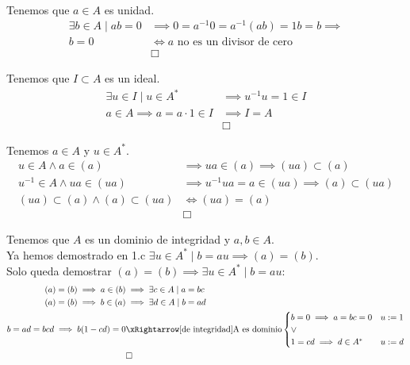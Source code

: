 \begin{solution}\\
Tenemos que $a \in A$ es unidad.
\begin{align}
\exists b \in A \mid ab = 0 
&\implies 0 = a^{-1}0 = a^{-1}(ab) = 1b = b \implies\\
b = 0 &\iff a \text{ no es un divisor de cero}\\
&\Box
\end{align}

Tenemos que $I \subset A$ es un ideal.
\begin{align}
\exists u \in I \mid u \in A^* &\implies u^{-1}u = 1 \in I\\
a \in A \implies a = a \cdot 1 \in I &\implies I=A\\
&\Box
\end{align}

Tenemos $a \in A$ y $u \in A^*$.
\begin{align}
u \in A \land a \in (a)
&\implies ua \in (a) 
\implies (ua) \subset (a)\\
u^{-1} \in A \land ua \in (ua)
&\implies u^{-1}ua = a \in (ua) 
\implies (a) \subset (ua)\\
(ua) \subset (a) \land (a) \subset (ua) &\iff (ua) = (a)\\
&\Box
\end{align}

Tenemos que $A$ es un dominio de integridad y $a,b \in A$. \\
Ya hemos demostrado en 1.c $\exists u \in A^* \mid b = au \implies (a) = (b)$.\\
Solo queda demostrar $(a) = (b) \implies \exists u \in A^* \mid b = au$:
\begin{align}
(a) = (b) \implies a \in (b) &\implies \exists c \in A \mid a = bc \\
(a) = (b) \implies b \in (a) &\implies \exists d \in A \mid b = ad \\
b = ad = bcd \implies b(1 - cd) = 0 
&\xRightarrow[\text{de integridad}]{\text{A es dominio}}
\begin{cases}
b = 0 \implies a = bc = 0 & u:=1\\
\lor\\
1 = cd \implies d \in A^* & u:=d
\end{cases}\\
&\Box
\end{align}

\end{solution}